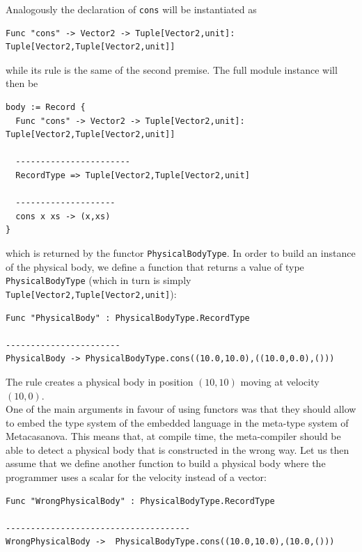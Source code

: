 \noindent
Analogously the declaration of \texttt{cons} will be instantiated as

\begin{lstlisting}
Func "cons" -> Vector2 -> Tuple[Vector2,unit]: Tuple[Vector2,Tuple[Vector2,unit]]
\end{lstlisting}

\noindent
while its rule is the same of the second premise. The full module instance will then be

\begin{lstlisting}
body := Record {
  Func "cons" -> Vector2 -> Tuple[Vector2,unit]: Tuple[Vector2,Tuple[Vector2,unit]]
  
  -----------------------
  RecordType => Tuple[Vector2,Tuple[Vector2,unit]
  
  --------------------
  cons x xs -> (x,xs)
}
\end{lstlisting}

\noindent
which is returned by the functor \texttt{PhysicalBodyType}. In order to build an instance of the physical body, we define a function that returns a value of type \texttt{PhysicalBodyType} (which in turn is simply\\ \texttt{Tuple[Vector2,Tuple[Vector2,unit]}):

\begin{lstlisting}
Func "PhysicalBody" : PhysicalBodyType.RecordType

-----------------------
PhysicalBody -> PhysicalBodyType.cons((10.0,10.0),((10.0,0.0),()))
\end{lstlisting}

\noindent
The rule creates a physical body in position $(10,10)$ moving at velocity $(10,0)$.\\

One of the main arguments in favour of using functors was that they should allow to embed the type system of the embedded language in the meta-type system of Metacasanova. This means that, at compile time, the meta-compiler should be able to detect a physical body that is constructed in the wrong way. Let us then assume that we define another function to build a physical body where the programmer uses a scalar for the velocity instead of a vector:

\begin{lstlisting}
Func "WrongPhysicalBody" : PhysicalBodyType.RecordType

-------------------------------------
WrongPhysicalBody ->  PhysicalBodyType.cons((10.0,10.0),(10.0,()))
\end{lstlisting}

